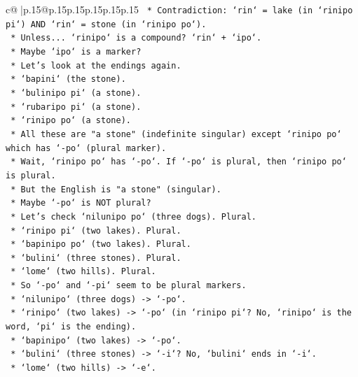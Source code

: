 \documentclass{article}
\begin{document}
{\begin{supertabular}{c@{$\;$}|p{.15\linewidth}@{}p{.15\linewidth}p{.15\linewidth}p{.15\linewidth}p{.15\linewidth}p{.15\linewidth}}
{{{\texttt{                *   Contradiction: `rin` = lake (in `rinipo pi`) AND `rin` = stone (in `rinipo po`).} \\
\texttt{                *   Unless... `rinipo` is a compound? `rin` + `ipo`.} \\
\texttt{                *   Maybe `ipo` is a marker?} \\
\texttt{                *   Let's look at the endings again.} \\
\texttt{                *   `bapini` (the stone).} \\
\texttt{                *   `bulinipo pi` (a stone).} \\
\texttt{                *   `rubaripo pi` (a stone).} \\
\texttt{                *   `rinipo po` (a stone).} \\
\texttt{                *   All these are "a stone" (indefinite singular) except `rinipo po` which has `{-}po` (plural marker).} \\
\texttt{                *   Wait, `rinipo po` has `{-}po`. If `{-}po` is plural, then `rinipo po` is plural.} \\
\texttt{                *   But the English is "a stone" (singular).} \\
\texttt{                *   Maybe `{-}po` is NOT plural?} \\
\texttt{                *   Let's check `nilunipo po` (three dogs). Plural.} \\
\texttt{                *   `rinipo pi` (two lakes). Plural.} \\
\texttt{                *   `bapinipo po` (two lakes). Plural.} \\
\texttt{                *   `bulini` (three stones). Plural.} \\
\texttt{                *   `lome` (two hills). Plural.} \\
\texttt{                *   So `{-}po` and `{-}pi` seem to be plural markers.} \\
\texttt{                *   `nilunipo` (three dogs) {-}> `{-}po`.} \\
\texttt{                *   `rinipo` (two lakes) {-}> `{-}po` (in `rinipo pi`? No, `rinipo` is the word, `pi` is the ending).} \\
\texttt{                *   `bapinipo` (two lakes) {-}> `{-}po`.} \\
\texttt{                *   `bulini` (three stones) {-}> `{-}i`? No, `bulini` ends in `{-}i`.} \\
\texttt{                *   `lome` (two hills) {-}> `{-}e`.} \\
}}}
\end{supertabular}}
\end{document}
